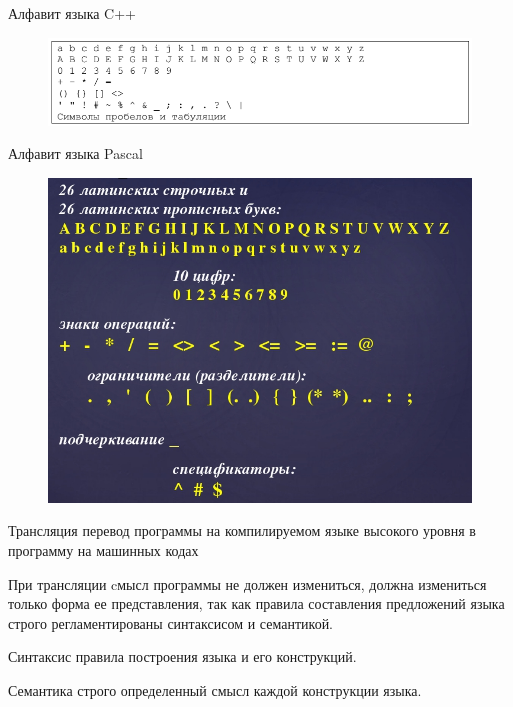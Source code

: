 \documentclass{beamer}
\begin{document}
\begin{frame}
\begin{block}{Алфавит языка C++}
\begin{figure}[h]
\centering
\includegraphics[scale=0.4]{images/lec01-pic10.png}
\end{figure}
\end{block}
\begin{block}{Алфавит языка Pascal}
\begin{figure}[h]
\centering
\includegraphics[scale=0.3]{images/lec01-pic11.png}
\end{figure}
\end{block}
\end{frame}

\begin{frame}
\begin{block}{Трансляция}
перевод программы на компилируемом языке высокого уровня в программу на машинных кодах
\end{block}
При трансляции cмысл программы не должен измениться, должна измениться только форма ее представления, так как правила составления предложений языка строго
регламентированы синтаксисом и семантикой. 
\begin{block}{Синтаксис}
правила построения языка и его конструкций.
\end{block}
\begin{block}{Семантика}
строго определенный смысл каждой конструкции языка.
\end{block}
\end{frame}
\end{document}
